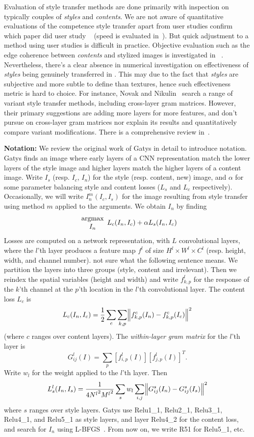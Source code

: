 \documentclass[runningheads]{llncs}
\begin{document}
Evaluation of style transfer methods are done primarily with inspection on typically couples of {\em styles} and {\em contents}. We are not aware of quantitative evaluations of the competence style transfer apart from user studies \todo confirm which paper did user study ~\cite{li2018closed} (speed is evaluated in~\cite{}).  But quick adjustment to a method using user studies is difficult in practice.  Objective evaluation such as the edge coherence between {\em contents} and stylized images is investigated in  ~\cite{li2018closed}. Nevertheless, there's a clear absence in numerical investigation on effectiveness of {\em styles} being genuinely transferred in \cite{UST,gatys2016image,Johnson2016Perceptual}.  This may due to the fact that {\em styles} are subjective and more subtle to define than textures, hence such effectiveness metric is hard to choice. For instance, Novak and Nikulin~\cite{novak2016improving} search a range of variant style transfer methods, including cross-layer gram matrices. However, their primary suggestions are adding more layers for more features, and don't pursue on cross-layer gram matrices nor explain its results and quantitatively compare variant modifications. There is a comprehensive review in~\cite{jing2017neural}. 

{\bf Notation:} We review the original work of Gatys \ea in detail to introduce notation.
Gatys \ea \cite{gatys2016image} finds an image where early layers of a CNN representation match the lower layers of the style image and higher layers match the higher layers of a content image.  Write $I_{s}$ (resp. $I_{c}$, $I_{n}$)  for the style (resp. content, new) image,
and $\alpha$ for some parameter balancing style and content losses ($L_s$ and $L_c$ respectively).  Occasionally, we
will write $I_n^m(I_c, I_s)$ for the image resulting from style transfer using method $m$ applied to the arguments.
We obtain $I_{n}$ by finding
\[
{\begin{array}{c}\mbox{argmax}\\{{I_{n}}}\end{array}} L_c(I_{n}, I_{c})+\alpha L_s(I_{n}, I_{c})
\]
Losses are computed on a network representation, with $L$ convolutional layers, where the $l$'th layer
produces a feature map $f^l$ of size $H^l \times W^l \times C^l$ (resp. height, width, and channel number). \todo not sure what the following sentence means. We partition
the layers into three groups (style, content and irrelevant). Then we reindex the spatial variables (height and width) and
write $f^l_{k,p}$ for the response of the $k$'th channel at the  $p$'th location in the $l$'th convolutional layer. The
content loss $L_c$ is 
\[
L_c(I_{n}, I_{c}) = \frac{1}{2}\sum_{c} \sum_{k,p} \norm{f^c_{k,p}(I_{n}) - f^c_{k,p}(I_{c})}^2
\]
(where $c$ ranges over content layers). The {\em within-layer gram
  matrix} for the $l$'th layer is
\[
G_{ij}^l(I) = \sum_p \left[f_{i,p}^l(I)\right]\left[f_{j,p}^l(I)\right]^{T}.
\]
Write $w_l$ for the weight applied to the $l$'th layer.  Then 
\[
L_s^l(I_{n}, I_{s}) = \frac{1}{4{N^l}^2{M^l}^2}\sum_{s}w_l \sum_{i,j}\norm{G^s_{ij}(I_{n})-G^s_{ij}(I_{s})}^2
\]
where $s$ ranges over style layers. Gatys \ea use Relu1\_1, Relu2\_1, Relu3\_1, Relu4\_1, and Relu5\_1 as style layers, and layer Relu4\_2 
for the content loss, and search for $I_{n}$ using L-BFGS~\cite{liu1989limited}.  From now on, we write R51 for Relu5\_1, etc. 
\end{document}
